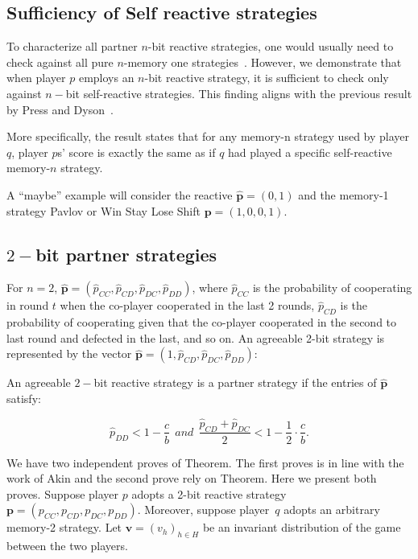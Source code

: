 \documentclass{article}
\theoremstyle{definition}
\begin{document}
\subsection{Sufficiency of Self reactive strategies}

To characterize all partner $n$-bit reactive strategies, one would usually
need to check against all pure $n$-memory one strategies~\cite{mcavoy:PRSA:2019}.
However, we demonstrate that when player $p$ employs an $n$-bit reactive strategy,
it is sufficient to check only against $n-$bit self-reactive strategies. This
finding aligns with the previous result by Press and Dyson~\cite{press:PNAS:2012}.

More specifically, the result states that for any memory-n strategy used by
player $q$, player $p$s' score is exactly the same as if $q$ had played a
specific self-reactive memory-$n$ strategy.

A ``maybe'' example will consider the reactive $\mathbf{\hat{p}} = (0, 1)$ and the
memory-1 strategy Pavlov or Win Stay Lose Shift $\mathbf{p} = (1, 0, 0, 1)$.

\subsection{$2-$bit partner strategies}

For $n=2$, $\mathbf{\hat{p}}=(\hat{p}_{CC}, \hat{p}_{CD}, \hat{p}_{DC}, \hat{p}_{DD})$, where
$\hat{p}_{CC}$ is the probability of cooperating in round \(t\) when the
co-player cooperated in the last 2 rounds, $\hat{p}_{CD}$ is the probability of
cooperating given that the co-player cooperated in the second to last round and
defected in the last, and so on. An agreeable 2-bit strategy is represented by
the vector $\mathbf{\hat{p}}=(1, \hat{p}_{CD}, \hat{p}_{DC}, \hat{p}_{DD})$:

An agreeable $2-$bit reactive strategy is a partner strategy if the entries of
$\mathbf{\hat{p}}$ satisfy:

\begin{equation}\label{eq:two_bit_conditions}
  \displaystyle \hat{p}_{DD} < 1\!-\! \frac{c}{b}  ~~and~~ \displaystyle \frac{\hat{p}_{CD} + \hat{p}_{DC}}{2} < 1- \frac{1}{2} \cdot \frac{c}{b}.
\end{equation}

We have two independent proves of Theorem. The first proves is in line with the
work of Akin and the second prove rely on Theorem. Here we present both proves.
Suppose player $p$ adopts a 2-bit reactive strategy $\mathbf{p}\!=\!(p_{CC},p_{CD}, p_{DC}, p_{DD})$. 
Moreover, suppose player~$q$ adopts an arbitrary memory-2 strategy. 
Let $\mathbf{v}=(v_h)_{h\in H}$ be an invariant distribution of the game between the two players. 
\end{document}

